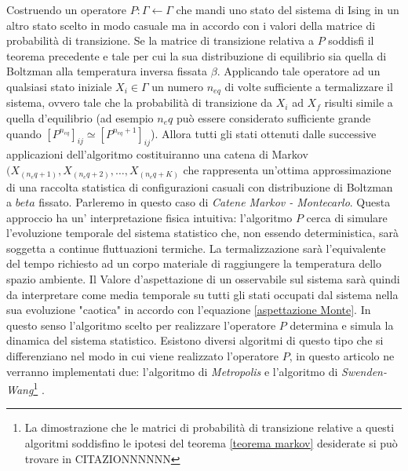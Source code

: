 \documentclass[11pt]{article}
\theoremstyle{plain}
\begin{document}
Costruendo un operatore $P: \Gamma \leftarrow \Gamma$ che mandi uno stato del sistema di Ising in un altro stato scelto in modo casuale ma in accordo con i valori della matrice di probabilità di transizione.\newline
Se la matrice di transizione relativa a $P$ soddisfi il teorema precedente e tale per cui la sua distribuzione di equilibrio sia quella di Boltzman alla temperatura inversa fissata $\beta$.\newline
Applicando tale operatore ad un qualsiasi stato iniziale $X_i \in \Gamma$ un numero $n_{eq}$ di volte sufficiente a termalizzare il sistema, ovvero tale che la probabilità di transizione da $X_i$ ad $X_f$ risulti simile a quella d'equilibrio (ad esempio $n_eq$ può essere considerato sufficiente grande quando   $[P^{n_{eq}}]_{ij} \simeq [P^{n_{eq}+1}]_{ij}$).\newline
Allora tutti gli stati ottenuti dalle successive applicazioni dell'algoritmo costituiranno una catena di Markov $(X_{(n_eq + 1)}, X_{(n_eq + 2)}, \ldots, X_{(n_eq + K)}$ che rappresenta un'ottima approssimazione di una raccolta statistica di configurazioni casuali con distribuzione di Boltzman a $beta$ fissato.\newline
Parleremo in questo caso di \emph{Catene Markov - Montecarlo}.
\medskip \newline
Questa approccio ha un' interpretazione fisica intuitiva: l'algoritmo $P$ cerca di simulare l'evoluzione temporale del sistema statistico che, non essendo deterministica, sarà soggetta a continue fluttuazioni termiche.
La termalizzazione sarà l'equivalente del tempo richiesto ad un corpo materiale di raggiungere la temperatura dello spazio ambiente. 
Il Valore d'aspettazione di un osservabile sul sistema sarà quindi da interpretare come media temporale su tutti gli stati occupati dal sistema nella sua evoluzione "caotica" in accordo con l'equazione \ref{aspettazione Monte}. In questo senso l'algoritmo scelto per realizzare l'operatore $P$ determina e simula la dinamica del sistema statistico.
\medskip\newline
Esistono diversi algoritmi di questo tipo che si differenziano nel modo in cui viene realizzato l'operatore $P$, in questo articolo ne verranno implementati due: l'algoritmo di \emph{Metropolis} e l'algoritmo di \emph{Swenden-Wang}\footnote{ La dimostrazione che le matrici di probabilità di transizione relative a questi algoritmi soddisfino le ipotesi del teorema \ref{teorema markov} desiderate si può trovare in CITAZIONNNNNN} .
\end{document}
